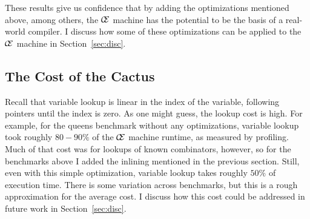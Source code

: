 These results give us confidence that by adding the optimizations mentioned
above, among others, the $\mathcal{\mathcal{C} \mskip -4mu \mathcal{E}}$ machine has the potential to be the
basis of a real-world compiler. I discuss how some of these optimizations can
be applied to the $\mathcal{\mathcal{C} \mskip -4mu \mathcal{E}}$ machine in Section~\ref{sec:disc}.

\subsection{The Cost of the Cactus}

Recall that variable lookup is linear in the index of the variable, following
pointers until the index is zero. As one might guess, the lookup cost is high.
For example, for the queens benchmark without any optimizations, variable lookup
took roughly $80-90\%$ of the $\mathcal{\mathcal{C} \mskip -4mu \mathcal{E}}$ machine runtime, as measured
by profiling. Much of that cost was for lookups of known combinators, however,
so for the benchmarks above I added the inlining mentioned in the previous
section. Still, even with this simple optimization, variable lookup takes
roughly $50\%$ of execution time. There is some variation across benchmarks, but
this is a rough approximation for the average cost. I discuss how this cost
could be addressed in future work in Section~\ref{sec:disc}.


